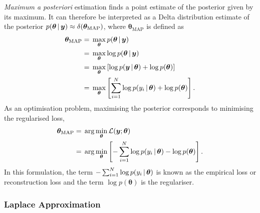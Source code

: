 \documentclass[10pt,a4paper,twocolumn]{article}
\begin{document}
\emph{Maximum a posteriori} estimation finds a point estimate of the posterior given by its maximum.
It can therefore be interpreted as a Delta distribution estimate of the posterior \(p(\bm \theta \, | \, \bm y) \approx \delta(\bm \theta_\mathrm{MAP})\), where \(\bm \theta_{\text{MAP}}\) is defined as
\begin{align}
    \bm \theta_\mathrm{MAP}
    ={} & \max_{\bm \theta} p(\bm \theta \, | \, \bm y) \nonumber                                            \\
    ={} & \max_{\bm \theta} \log p(\bm \theta \, | \, \bm y) \nonumber                                       \\
    ={} & \max_{\bm \theta} \left[ \log p(\bm y \, | \, \bm \theta) + \log p(\bm \theta) \right] \nonumber   \\
    ={} & \max_{\bm \theta} \left[ \sum_{i=1}^N \log p(y_i \, | \, \bm \theta) + \log p(\bm \theta) \right].
\end{align}
As an optimisation problem, maximising the posterior corresponds to minimising the regularised loss,
\begin{align}
    \bm \theta_{\text{MAP}} ={} & \arg \min_{\bm \theta} \mathcal{L}(\bm y; \bm \theta)                                                   \\
    ={}                         & \arg \min_{\bm \theta} \left[ -\sum_{i=1}^N \log p(y_i \, | \, \bm \theta) - \log p(\bm \theta) \right].
\end{align}
In this formulation, the term \(-\sum_{i=1}^N \log p(y_i \, | \, \bm \theta)\) is known as the empirical loss or reconstruction loss and the term \(\log p(\bm \theta)\) is the regulariser.

\subsubsection{Laplace Approximation}
\end{document}

